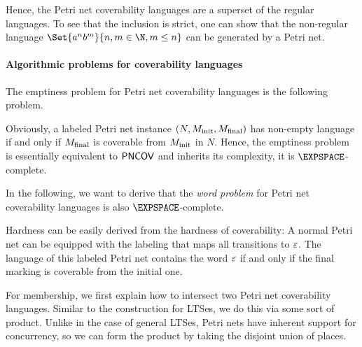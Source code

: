 \documentclass[../../diss.tex]{subfiles}
\begin{document}
Hence, the Petri net coverability languages are a superset of the regular languages.
To see that the inclusion is strict, one can show that the non-regular language $\Set{ a^n b^m}{ n,m \in \N, m \leq n }$ can be generated by a Petri net.

%
\cheatpagebreak
%

\paragraph{Algorithmic problems for coverability languages}

The emptiness problem for Petri net coverability languages is the following problem.

\begin{problem}
    \problemshort{($\EMPTYPNCOV$)}
\end{problem}

Obviously, a labeled Petri net instance $(N, M_{\text{init}}, M_{\text{final}})$ has non-empty language if and only if $M_{\text{final}}$ is coverable from $M_{\text{init}}$ in $N$.
Hence, the emptiness problem is essentially equivalent to $\mathsf{PNCOV}$ and inherits its complexity, \ie it is $\EXPSPACE$-complete.

In the following, we want to derive that the \emph{word problem} for Petri net coverability languages is also $\EXPSPACE$-complete.

\begin{problem}
    \problemshort{($\WORDPNCOV$)}
\end{problem}

Hardness can be easily derived from the hardness of coverability:
A normal Petri net can be equipped with the labeling that maps all transitions to $\varepsilon$.
The language of this labeled Petri net contains the word $\varepsilon$ if and only if the final marking is coverable from the initial one.

For membership, we first explain how to intersect two Petri net coverability languages.
Similar to the construction for LTSes, we do this via some sort of product.
Unlike in the case of general LTSes, Petri nets have inherent support for concurrency, so we can form the product by taking the disjoint union of places.
\end{document}
